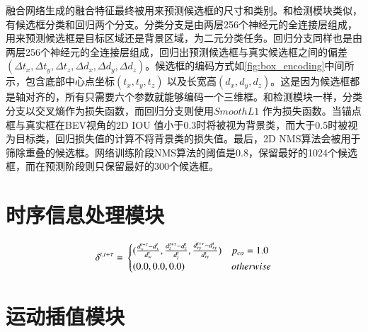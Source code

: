 融合网络生成的融合特征最终被用来预测候选框的尺寸和类别。和检测模块类似，有候选框分类和回归两个分支。分类分支是由两层256个神经元的全连接层组成，用来预测候选框是目标区域还是背景区域，为二元分类任务。回归分支同样也是由两层256个神经元的全连接层组成，回归出预测候选框与真实候选框之间的偏差 $(\Delta t_x,  \Delta t_y, \Delta t_z, \Delta d_x, \Delta d_y, \Delta d_z)$。候选框的编码方式如\figurename \ref{fig:box_encoding}中间所示，包含底部中心点坐标$(t_x, t_y, t_z)$ 以及长宽高$(d_x, d_y, d_z)$。这是因为候选框都是轴对齐的，所有只需要六个参数就能够编码一个三维框。和检测模块一样，分类分支以交叉熵作为损失函数，而回归分支则使用$Smooth L1$ 作为损失函数。当锚点框与真实框在BEV视角的2D IOU 值小于0.3时将被视为背景类，而大于0.5时被视为目标类，回归损失值的计算不将背景类的损失值。最后，2D NMS算法会被用于筛除重叠的候选框。网络训练阶段NMS算法的阈值是0.8，保留最好的1024个候选框，而在预测阶段则只保留最好的300个候选框。

\section{时序信息处理模块}
\label{temporal_module}

\begin{equation}
\delta^{t, t+\tau} = \\
\begin{cases}
(\frac{d_{x}^{t+\tau} - d_{x}^{t}}{d^t_{w}}, \frac{d_{z}^{t+\tau} - d_{z}^{t} }{d^t_{l}}, \frac{d_{ry}^{t+\tau} - d_{ry}^{t}}{d^t_{ry}}) & p_{co} = 1.0 \\
(0.0,0.0, 0.0) &  otherwise
\end{cases}
\end{equation}

\section{运动插值模块}
\label{interpolation}

